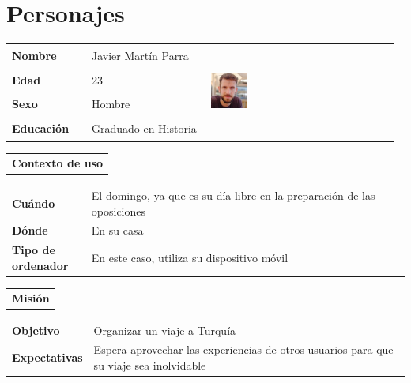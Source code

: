 \documentclass[11pt]{article}
\begin{document}
\section{Personajes}
\begin{table}[H]
  \centering
  \begin{tabular}{p{0.2\linewidth}|p{0.3\linewidth}p{0.475\linewidth}}
    \toprule
    \textbf{Nombre} & Javier Martín Parra &\multirow{4}{*}{\begin{minipage}{1.\textwidth}\includegraphics[width=0.2\textwidth, height=30mm]{Javier}\end{minipage}}\\
    \textbf{Edad} & 23 & \\
    \textbf{Sexo} & Hombre & \\
    \textbf{Educación} & Graduado en Historia & \\
    \bottomrule
  \end{tabular}

  \begin{tabular}{l}
    \textbf{Contexto de uso} 
  \end{tabular}
  
  \begin{tabular}{p{0.2\linewidth}|p{0.8\linewidth}}
    \toprule
    \textbf{Cuándo} & El domingo, ya que es su día libre en la preparación de las oposiciones\\
    \textbf{Dónde}  & En su casa\\
    \textbf{Tipo de ordenador} & En este caso, utiliza su dispositivo móvil\\
    \bottomrule
  \end{tabular}

  \begin{tabular}{l}
    \textbf{Misión} 
  \end{tabular}
  
  \begin{tabular}{p{0.2\linewidth}|p{0.8\linewidth}}
    \toprule
    \textbf{Objetivo} & Organizar un viaje a Turquía\\
    \textbf{Expectativas}  & Espera aprovechar las experiencias de otros usuarios para que su viaje sea inolvidable \\
    \bottomrule
  \end{tabular}


\end{table}
\end{document}
